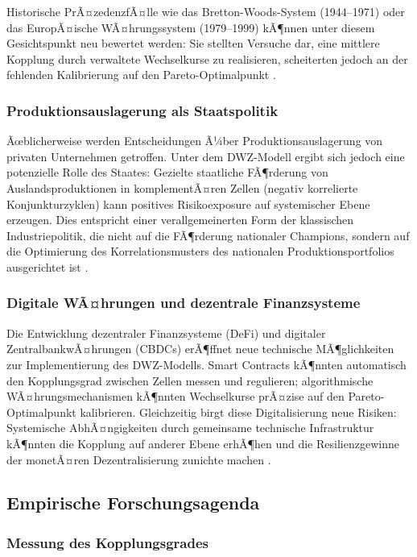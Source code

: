 ﻿\documentclass[a4paper,12pt]{article}
\theoremstyle{definition}
\begin{document}
Historische PrÃ¤zedenzfÃ¤lle wie das Bretton-Woods-System (1944--1971) oder das EuropÃ¤ische
WÃ¤hrungssystem (1979--1999) kÃ¶nnen unter diesem Gesichtspunkt neu bewertet werden:
Sie stellten Versuche dar, eine mittlere Kopplung durch verwaltete Wechselkurse zu realisieren,
scheiterten jedoch an der fehlenden Kalibrierung auf den Pareto-Optimalpunkt \citep{eichengreen1998globalizing}.

\subsubsection{Produktionsauslagerung als Staatspolitik}

Ãœblicherweise werden Entscheidungen Ã¼ber Produktionsauslagerung von privaten Unternehmen
getroffen. Unter dem DWZ-Modell ergibt sich jedoch eine potenzielle Rolle des Staates:
Gezielte staatliche FÃ¶rderung von Auslandsproduktionen in komplementÃ¤ren Zellen (negativ
korrelierte Konjunkturzyklen) kann positives Risikoexposure auf systemischer Ebene erzeugen.
Dies entspricht einer verallgemeinerten Form der klassischen Industriepolitik, die nicht
auf die FÃ¶rderung nationaler Champions, sondern auf die Optimierung des Korrelationsmusters
des nationalen Produktionsportfolios ausgerichtet ist \citep{rodrik2004industrial}.

\subsubsection{Digitale WÃ¤hrungen und dezentrale Finanzsysteme}

Die Entwicklung dezentraler Finanzsysteme (DeFi) und digitaler ZentralbankwÃ¤hrungen
(CBDCs) erÃ¶ffnet neue technische MÃ¶glichkeiten zur Implementierung des DWZ-Modells.
Smart Contracts kÃ¶nnten automatisch den Kopplungsgrad zwischen Zellen messen und regulieren;
algorithmische WÃ¤hrungsmechanismen kÃ¶nnten Wechselkurse prÃ¤zise auf den Pareto-Optimalpunkt
kalibrieren. Gleichzeitig birgt diese Digitalisierung neue Risiken: Systemische AbhÃ¤ngigkeiten
durch gemeinsame technische Infrastruktur kÃ¶nnten die Kopplung auf anderer Ebene erhÃ¶hen
und die Resilienzgewinne der monetÃ¤ren Dezentralisierung zunichte machen \citep{borio2021cbdc}.

\subsection{Empirische Forschungsagenda}

\subsubsection{Messung des Kopplungsgrades}
\end{document}

